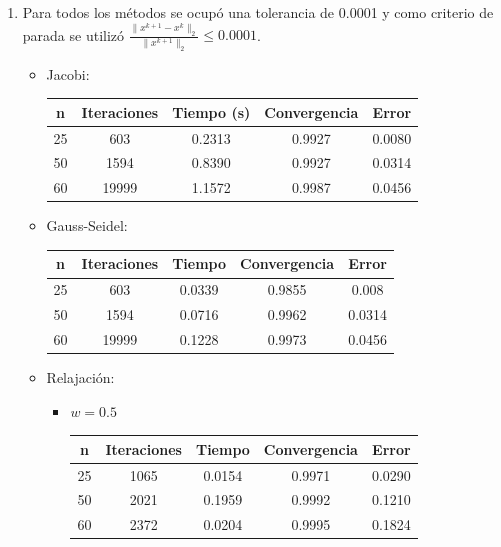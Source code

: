 \documentclass{udpreport}
\providecommand{\norm}[1]{\lVert#1\rVert}
\begin{document}
\begin{enumerate}
\begin{enumerate}
\begin{itemize}
\begin{itemize}
				\end{itemize}
			\end{itemize}
			\item Para todos los métodos se ocupó una tolerancia de 0.0001 y como criterio de parada se utilizó $\frac{\norm{x^{k+1}-x^{k}}_{2}}{\norm{x^{k+1}}_{2}}\leq 0.0001$. 
			\begin{itemize}
				\item Jacobi:
					\begin{table}[H]
						\centering
						\begin{tabular}{|c|c|c|c|c|}
							\hline 
							n & Iteraciones & Tiempo (s) & Convergencia & Error \\
							\hline
							25 & 603 &0.2313 & 0.9927 & 0.0080 \\
							\hline
							50 & 1594 & 0.8390 & 0.9927 & 0.0314 \\
							\hline
							60 & 19999 & 1.1572 & 0.9987 & 0.0456 \\
							\hline
						\end{tabular}
					\end{table}
				\item Gauss-Seidel:
				 \begin{table}[H]
						\centering
						\begin{tabular}{|c|c|c|c|c|}
							\hline 
							n & Iteraciones & Tiempo & Convergencia & Error \\
							\hline
							25 &603 & 0.0339 & 0.9855 & 0.008 \\
							\hline
							50 & 1594 & 0.0716 & 0.9962 & 0.0314 \\
							\hline
							60 & 19999 & 0.1228 & 0.9973 & 0.0456 \\
							\hline
						\end{tabular}
					\end{table}
				\item Relajación:
					\begin{itemize}
					\item $w=0.5$
						\begin{table}[H]
						\centering
						\begin{tabular}{|c|c|c|c|c|}
							\hline 
							n & Iteraciones & Tiempo & Convergencia & Error \\
							\hline
							25 & 1065 & 0.0154 & 0.9971 & 0.0290 \\
							\hline
							50 & 2021 & 0.1959 & 0.9992 & 0.1210 \\
							\hline
							60 & 2372 & 0.0204 & 0.9995 & 0.1824\\

\end{tabular}
\end{table}
\end{itemize}
\end{itemize}
\end{enumerate}
\end{enumerate}
\end{document}
